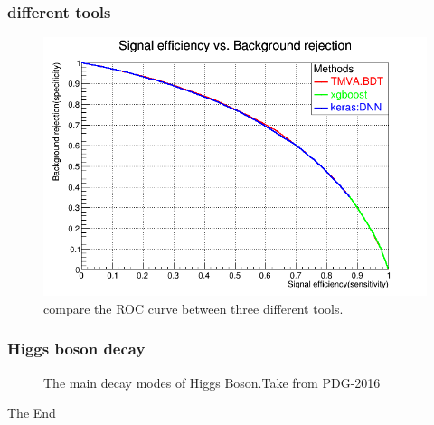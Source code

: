 \documentclass{beamer}
\begin{document}
\begin{frame}
\frametitle{different tools}
\begin{figure}
\includegraphics[scale=0.25]{./figures/tmva_xgboost.png}
\caption{compare the ROC curve between three different tools.}
\end{figure}
\end{frame}

\begin{frame}
\frametitle{Higgs boson decay}
\begin{figure}[H]
\centering
{} 
\caption{The main decay modes of Higgs Boson.Take from 	PDG-2016}
\end{figure}
\end{frame}







\begin{frame}
\Huge{\centerline{The End}}
\end{frame}

\end{document}
